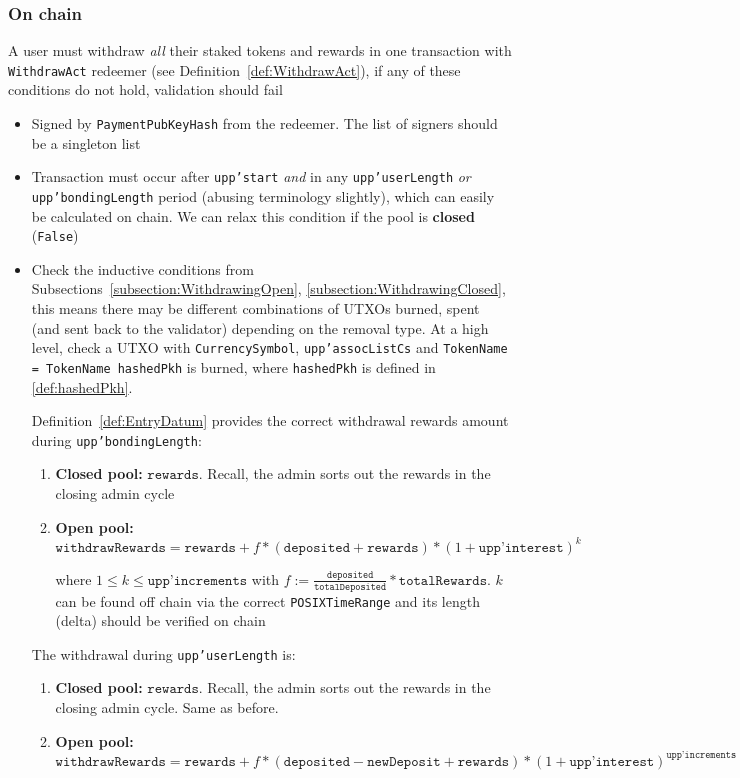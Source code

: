 \documentclass[10pt, a4paper]{article}
\theoremstyle{definition}
\begin{document}
\subsubsection{On chain}\label{subsection:UserWithdrawOnChain}
A user must withdraw \textit{all} their staked tokens and rewards in one transaction with \texttt{WithdrawAct} redeemer (see Definition~\ref{def:WithdrawAct}), if any of these conditions do not hold, validation should fail
\begin{itemize}
\item{Signed by \texttt{PaymentPubKeyHash} from the redeemer. The list of signers should be a singleton list}
\item{Transaction must occur after \texttt{upp'start} \textit{and} in any \texttt{upp'userLength} \textit{or} \texttt{upp'bondingLength} period (abusing terminology slightly), which can easily be calculated on chain. We can relax this condition if the pool is \textbf{closed} (\texttt{False})}
\item{Check the inductive conditions from Subsections~\ref{subsection:WithdrawingOpen}, \ref{subsection:WithdrawingClosed}, this means there may be different combinations of UTXOs burned, spent (and sent back to the validator) depending on the removal type. At a high level, check a UTXO with \texttt{CurrencySymbol}, \texttt{upp'assocListCs} and \texttt{TokenName = TokenName hashedPkh} is burned, where \texttt{hashedPkh} is defined in \ref{def:hashedPkh}. 

Definition~\ref{def:EntryDatum} provides the correct withdrawal rewards amount during \texttt{upp'bondingLength}:
\begin{enumerate}
\item{\textbf{Closed pool:}
 $\texttt{rewards}$.  Recall, the admin sorts out the rewards in the closing admin cycle}
\item{\textbf{Open pool:} $\texttt{withdrawRewards} = \texttt{rewards} + f* (\texttt{deposited} + \texttt{rewards})* (1 + \texttt{upp'interest})^k$

 where $1 \leq k \leq \texttt{upp'increments}$ with $f := \frac{\texttt{deposited}}{\texttt{totalDeposited}} * \texttt{totalRewards}$. $k$ can be found off chain via the correct \texttt{POSIXTimeRange} and its length (delta) should be verified on chain}
\end{enumerate}

The withdrawal during \texttt{upp'userLength} is:
\begin{enumerate}
\item{\textbf{Closed pool:}
 $\texttt{rewards}$.  Recall, the admin sorts out the rewards in the closing admin cycle. Same as before.}
\item{\textbf{Open pool:} $\texttt{withdrawRewards} = \texttt{rewards} + f* (\texttt{deposited} - \texttt{newDeposit}  + \texttt{rewards})* (1 + \texttt{upp'interest})^\texttt{upp'increments}$

}
\end{enumerate}}
\end{itemize}
\end{document}
